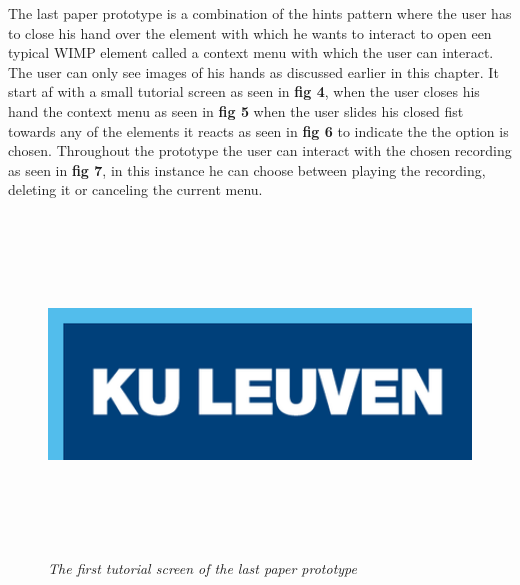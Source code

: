The last paper prototype is a combination of the hints pattern where the user has to close his hand over the element with which he wants to interact to open een typical WIMP element called a context menu with which the user can interact. The user can only see images of his hands as discussed earlier in this chapter. It start af with a small tutorial screen as seen in \textbf{ fig 4}, when the user closes his hand the context menu as seen in \textbf{ fig 5} when the user slides his closed fist towards any of the elements it reacts as seen in \textbf{ fig 6} to indicate the the option is chosen. Throughout the prototype the user can interact with the chosen recording as seen in \textbf{ fig 7}, in this instance he can choose between playing the recording, deleting it or canceling the current menu.

\begin{figure}[H]
	\begin{center}
		\includegraphics[width=16cm, height=9cm]{KUL.png}
		\caption{\emph{The first tutorial screen of the last paper prototype}}
		\label{The first tutorial screen of the last paper prototype}
	\end{center}
\end{figure}

